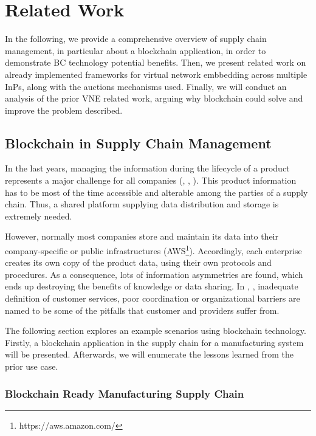 \chapter{Related Work}
\label{ch:relatedwork}

In the following, we provide a comprehensive overview of supply chain management, in particular about a blockchain application, in order to demonstrate BC technology potential benefits. Then, we present related work on already implemented frameworks for virtual network embbedding across multiple InPs, along with the auctions mechanisms used. Finally, we will conduct an analysis of the prior VNE related work, arguing why blockchain could solve and improve the problem described.

\section{Blockchain in Supply Chain Management}

In the last years, managing the information during the lifecycle of a product represents a major challenge for all companies (\citep{karkkainen2003product}, \citep{tuttle2002you}, \citep{karkkainen2002wireless}). This product information has to be most of the time accessible and alterable among the parties of a supply chain. Thus, a shared platform supplying data distribution and storage is extremely needed.

However, normally most companies store and maintain its data into their company-specific or public infrastructures (AWS\footnote{https://aws.amazon.com/}). Accordingly, each enterprise creates its own copy of the product data, using their own protocols and procedures.  As a consequence, lots of information asymmetries are found, which ends up destroying the benefits of knowledge or data sharing. In \citep{lee1992managing}, \citep{fiala2005information},\citep{li2008confidentiality} inadequate definition of customer services, poor coordination or organizational barriers are named to be some of the pitfalls that customer and providers suffer from.

The following section explores an example scenarios using blockchain technology. Firstly, a blockchain application in the supply chain for a manufacturing system will be presented. Afterwards, we will enumerate the lessons learned from the prior use case.

\subsection{Blockchain Ready Manufacturing Supply Chain}

